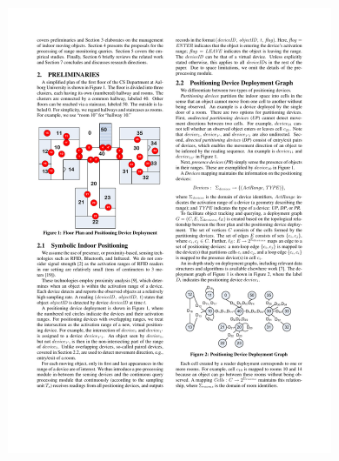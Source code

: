 \begin{frame}
\begin{columns}[c]
    \vspace{-30pt}
    \begin{figure}[tb]
      \includegraphics[width=\columnwidth]{figures/2-2-1.pdf}
    \end{figure}
    \vspace{-20pt}
    \pause
    \begin{figure}[tb]

\end{figure}
\end{columns}
\end{frame}
